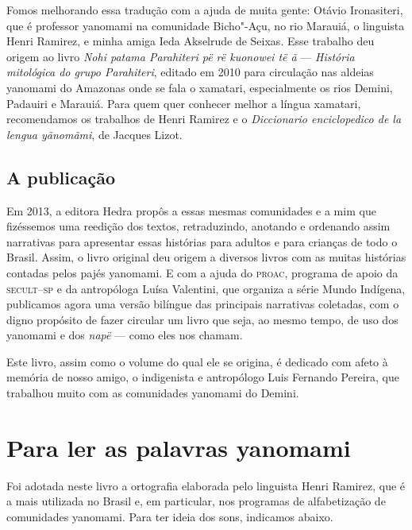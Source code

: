 Fomos melhorando essa tradução com a ajuda de muita gente: Otávio
Ironasiteri, que é professor yanomami na comunidade Bicho"-Açu, no rio
Marauiá, o linguista Henri Ramirez, e minha amiga Ieda Akselrude de
Seixas. Esse trabalho deu origem ao livro \textit{Nohi patama Parahiteri
pë rë kuonowei të ã} --- \textit{História mitológica do grupo Parahiteri},
editado em 2010 para circulação nas aldeias yanomami do Amazonas onde se
fala o xamatari, especialmente os rios Demini, Padauiri e Marauiá. Para quem quer conhecer melhor a língua xamatari, recomendamos os trabalhos de Henri Ramirez e o \textit{Diccionario enciclopedico de la lengua yãnomãmi}, de Jacques Lizot.  

\section{A publicação}

Em 2013, a editora Hedra propôs a essas mesmas comunidades e a mim que
fizéssemos uma reedição dos textos, retraduzindo, anotando e ordenando assim
narrativas para apresentar essas histórias para adultos e para crianças de todo
o Brasil. Assim, o livro original deu origem a diversos livros com as muitas
histórias contadas pelos pajés yanomami.  E com a ajuda do \textsc{proac},
programa de apoio da \textsc{secult--sp} e da antropóloga Luísa Valentini, que organiza a
série Mundo Indígena, publicamos agora uma versão bilíngue das principais
narrativas coletadas, com o digno propósito de fazer circular um livro que
seja, ao mesmo tempo, de uso dos yanomami e dos \textit{napë} --- como eles nos chamam. 

Este livro, assim como o volume do qual ele se origina, é dedicado com afeto à memória de nosso amigo, o indigenista e antropólogo Luis Fernando Pereira, que trabalhou muito com as comunidades yanomami do Demini.

\chapter{Para ler as palavras yanomami}


Foi adotada neste livro a ortografia elaborada pelo linguista Henri Ramirez, que é a mais utilizada no Brasil e, em particular, nos programas de alfabetização de comunidades yanomami. Para ter ideia dos sons, indicamos abaixo.

\bigskip

